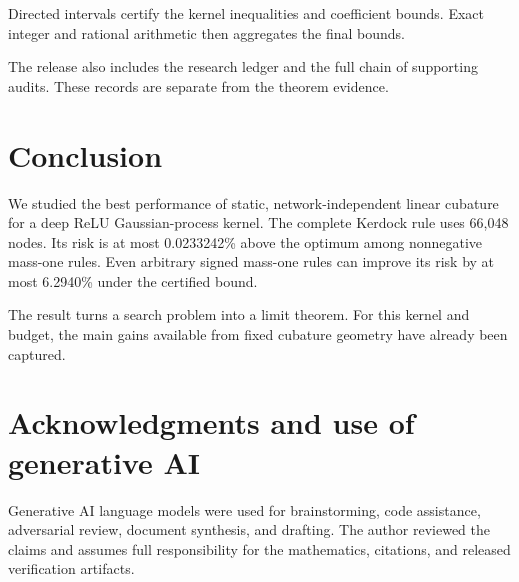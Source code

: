 \documentclass[11pt]{article}
\begin{document}
Directed intervals certify the kernel inequalities and coefficient
bounds. Exact integer and rational arithmetic then aggregates the final
bounds.

The release also includes the research ledger and the full chain of
supporting audits. These records are separate from the theorem evidence.

\section{Conclusion}\label{conclusion}

We studied the best performance of static, network-independent linear
cubature for a deep ReLU Gaussian-process kernel. The complete Kerdock
rule uses 66,048 nodes. Its risk is at most 0.0233242\% above the
optimum among nonnegative mass-one rules. Even arbitrary signed mass-one
rules can improve its risk by at most 6.2940\% under the certified
bound.

The result turns a search problem into a limit theorem. For this kernel
and budget, the main gains available from fixed cubature geometry have
already been captured.

\section{Acknowledgments and use of generative
AI}\label{acknowledgments-and-use-of-generative-ai}

Generative AI language models were used for brainstorming, code
assistance, adversarial review, document synthesis, and drafting. The
author reviewed the claims and assumes full responsibility for the
mathematics, citations, and released verification artifacts.

\renewcommand\refname{References}
  
\end{document}
